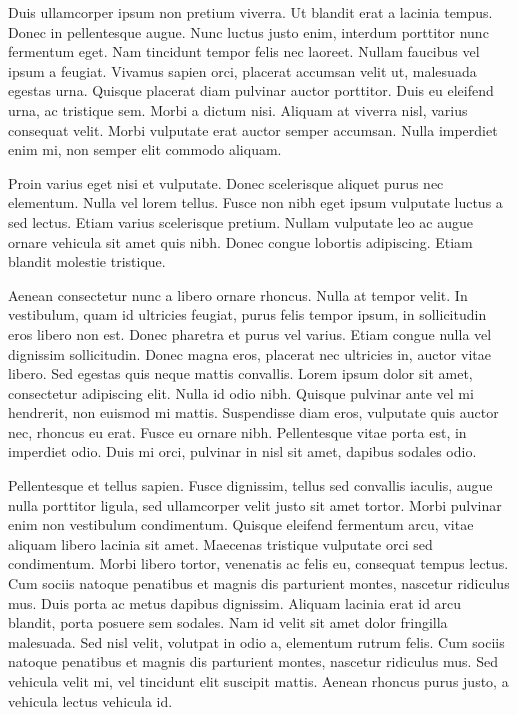 \documentclass[2pt,a4paper,twoside ]{article}
\begin{document}
\begin{multicols}{2}
Duis ullamcorper ipsum non pretium viverra. Ut blandit erat a lacinia tempus. Donec in pellentesque augue. Nunc luctus justo enim, interdum porttitor nunc fermentum eget. Nam tincidunt tempor felis nec laoreet. Nullam faucibus vel ipsum a feugiat. Vivamus sapien orci, placerat accumsan velit ut, malesuada egestas urna. Quisque placerat diam pulvinar auctor porttitor. Duis eu eleifend urna, ac tristique sem. Morbi a dictum nisi. Aliquam at viverra nisl, varius consequat velit. Morbi vulputate erat auctor semper accumsan. Nulla imperdiet enim mi, non semper elit commodo aliquam.

Proin varius eget nisi et vulputate. Donec scelerisque aliquet purus nec elementum. Nulla vel lorem tellus. Fusce non nibh eget ipsum vulputate luctus a sed lectus. Etiam varius scelerisque pretium. Nullam vulputate leo ac augue ornare vehicula sit amet quis nibh. Donec congue lobortis adipiscing. Etiam blandit molestie tristique.

Aenean consectetur nunc a libero ornare rhoncus. Nulla at tempor velit. In vestibulum, quam id ultricies feugiat, purus felis tempor ipsum, in sollicitudin eros libero non est. Donec pharetra et purus vel varius. Etiam congue nulla vel dignissim sollicitudin. Donec magna eros, placerat nec ultricies in, auctor vitae libero. Sed egestas quis neque mattis convallis. Lorem ipsum dolor sit amet, consectetur adipiscing elit. Nulla id odio nibh. Quisque pulvinar ante vel mi hendrerit, non euismod mi mattis. Suspendisse diam eros, vulputate quis auctor nec, rhoncus eu erat. Fusce eu ornare nibh. Pellentesque vitae porta est, in imperdiet odio. Duis mi orci, pulvinar in nisl sit amet, dapibus sodales odio.

Pellentesque et tellus sapien. Fusce dignissim, tellus sed convallis iaculis, augue nulla porttitor ligula, sed ullamcorper velit justo sit amet tortor. Morbi pulvinar enim non vestibulum condimentum. Quisque eleifend fermentum arcu, vitae aliquam libero lacinia sit amet. Maecenas tristique vulputate orci sed condimentum. Morbi libero tortor, venenatis ac felis eu, consequat tempus lectus. Cum sociis natoque penatibus et magnis dis parturient montes, nascetur ridiculus mus. Duis porta ac metus dapibus dignissim. Aliquam lacinia erat id arcu blandit, porta posuere sem sodales. Nam id velit sit amet dolor fringilla malesuada. Sed nisl velit, volutpat in odio a, elementum rutrum felis. Cum sociis natoque penatibus et magnis dis parturient montes, nascetur ridiculus mus. Sed vehicula velit mi, vel tincidunt elit suscipit mattis. Aenean rhoncus purus justo, a vehicula lectus vehicula id.


\end{multicols}
\end{document}

